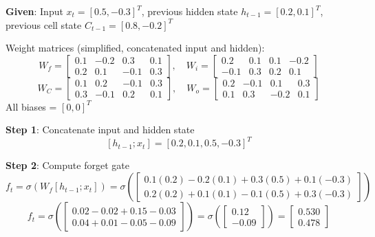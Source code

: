 \documentclass[11pt,a4paper]{article}
\begin{document}
\begin{tcolorbox}[colback=green!5!white,colframe=green!75!black,title=\textbf{Worked Example 22: LSTM Gate Computations}]
\textbf{Given}: Input $x_t = [0.5, -0.3]^T$, previous hidden state $h_{t-1} = [0.2, 0.1]^T$, previous cell state $C_{t-1} = [0.8, -0.2]^T$

Weight matrices (simplified, concatenated input and hidden):
\[
W_f = \begin{bmatrix} 0.1 & -0.2 & 0.3 & 0.1 \\ 0.2 & 0.1 & -0.1 & 0.3 \end{bmatrix}, \quad
W_i = \begin{bmatrix} 0.2 & 0.1 & 0.1 & -0.2 \\ -0.1 & 0.3 & 0.2 & 0.1 \end{bmatrix}
\]
\[
W_C = \begin{bmatrix} 0.1 & 0.2 & -0.1 & 0.3 \\ 0.3 & -0.1 & 0.2 & 0.1 \end{bmatrix}, \quad
W_o = \begin{bmatrix} 0.2 & -0.1 & 0.1 & 0.3 \\ 0.1 & 0.3 & -0.2 & 0.1 \end{bmatrix}
\]
All biases = $[0, 0]^T$

\textbf{Step 1}: Concatenate input and hidden state
\[
[h_{t-1}; x_t] = [0.2, 0.1, 0.5, -0.3]^T
\]

\textbf{Step 2}: Compute forget gate
\[
f_t = \sigma(W_f [h_{t-1}; x_t]) = \sigma\left(\begin{bmatrix} 0.1(0.2) - 0.2(0.1) + 0.3(0.5) + 0.1(-0.3) \\ 0.2(0.2) + 0.1(0.1) - 0.1(0.5) + 0.3(-0.3) \end{bmatrix}\right)
\]
\[
f_t = \sigma\left(\begin{bmatrix} 0.02 - 0.02 + 0.15 - 0.03 \\ 0.04 + 0.01 - 0.05 - 0.09 \end{bmatrix}\right) = \sigma\left(\begin{bmatrix} 0.12 \\ -0.09 \end{bmatrix}\right) = \begin{bmatrix} 0.530 \\ 0.478 \end{bmatrix}
\]


\end{tcolorbox}
\end{document}
